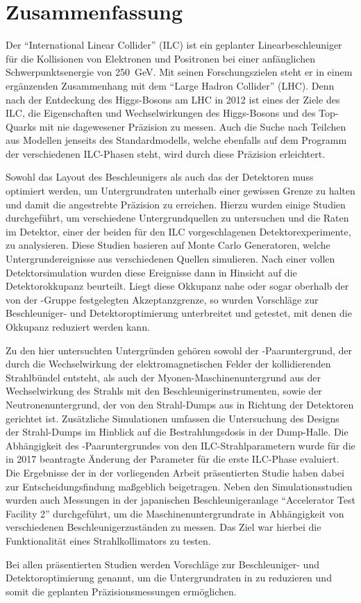 \chapter*{Zusammenfassung}
Der ``International Linear Collider'' (ILC) ist ein geplanter Linearbeschleuniger f\"ur die Kollisionen von Elektronen und Positronen bei einer anf\"anglichen Schwerpunktsenergie von \SI{250}{\GeV}.
Mit seinen Forschungszielen steht er in einem erg\"anzenden Zusammenhang mit dem ``Large Hadron Collider'' (LHC).
Denn nach der Entdeckung des Higgs-Bosons am LHC in 2012 ist eines der Ziele des ILC, die Eigenschaften und Wechselwirkungen des Higgs-Bosons und des Top-Quarks mit nie dagewesener Präzision zu messen.
Auch die Suche nach Teilchen aus Modellen jenseits des Standardmodells, welche ebenfalls auf dem Programm der verschiedenen ILC-Phasen steht, wird durch diese Präzision erleichtert.

Sowohl das Layout des Beschleunigers als auch das der Detektoren muss optimiert werden, um Untergrundraten unterhalb einer gewissen Grenze zu halten und damit die angestrebte Pr\"azision zu erreichen.
Hierzu wurden einige Studien durchgeführt, um verschiedene Untergrundquellen zu untersuchen und die Raten im \sid Detektor, einer der beiden f\"ur den ILC vorgeschlagenen Detektorexperimente, zu analysieren.
Diese Studien basieren auf Monte Carlo Generatoren, welche Untergrundereignisse aus verschiedenen Quellen simulieren.
Nach einer vollen Detektorsimulation wurden diese Ereignisse dann in Hinsicht auf die \sid Detektorokkupanz beurteilt.
Liegt diese Okkupanz nahe oder sogar oberhalb der von der \sid-Gruppe festgelegten Akzeptanzgrenze, so wurden Vorschläge zur Beschleuniger- und Detektoroptimierung unterbreitet und getestet, mit denen die Okkupanz reduziert werden kann.

Zu den hier untersuchten Untergründen gehören sowohl der \positron\electron-Paaruntergrund, der durch die Wechselwirkung der elektromagnetischen Felder der kollidierenden Strahlb\"undel entsteht, als auch der Myonen-Maschinenuntergrund aus der Wechselwirkung des Strahls mit den Beschleunigerinstrumenten, sowie der Neutronenuntergrund, der von den Strahl-Dumps aus in Richtung der Detektoren gerichtet ist.
Zusätzliche Simulationen umfassen die Untersuchung des Designs der Strahl-Dumps im Hinblick auf die Bestrahlungsdosis in der Dump-Halle.
Die Abhängigkeit des \positron\electron-Paaruntergrundes von den ILC-Strahlparametern wurde f\"ur die in 2017 beantragte Änderung der Parameter f\"ur die erste ILC-Phase evaluiert.
Die Ergebnisse der in der vorliegenden Arbeit präsentierten Studie haben dabei zur Entscheidungsfindung maßgeblich beigetragen.
Neben den Simulationsstudien wurden auch Messungen in der japanischen Beschleunigeranlage ``Accelerator Test Facility 2'' durchgeführt, um die Maschinenuntergrundrate in Abhängigkeit von verschiedenen Beschleunigerzust\"anden zu messen.
Das Ziel war hierbei die Funktionalität eines Strahlkollimators zu testen.

Bei allen präsentierten Studien werden Vorschläge zur Beschleuniger- und Detektoroptimierung genannt, um die Untergrundraten in \sid zu reduzieren und somit die geplanten Pr\"azisionsmessungen ermöglichen.